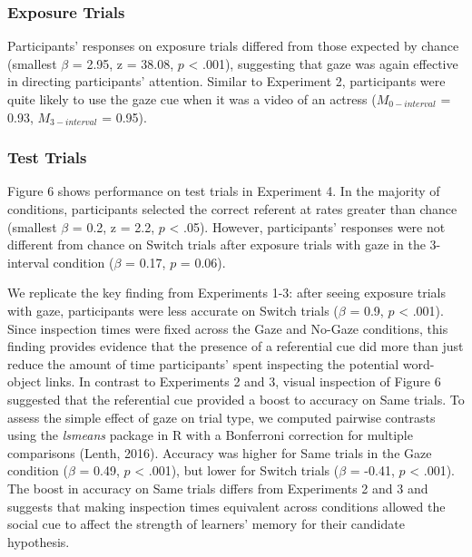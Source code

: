 \documentclass[oneside]{report}
\begin{document}
\hypertarget{exposure-trials-3}{%
\subsubsection{Exposure Trials}\label{exposure-trials-3}}

Participants' responses on exposure trials differed from those expected
by chance (smallest \(\beta\) = 2.95, z = 38.08, \(p\) \textless{}
.001), suggesting that gaze was again effective in directing
participants' attention. Similar to Experiment 2, participants were
quite likely to use the gaze cue when it was a video of an actress
(\(M_{0-interval}\) = 0.93, \(M_{3-interval}\) = 0.95).

\hypertarget{test-trials-3}{%
\subsubsection{Test Trials}\label{test-trials-3}}

Figure 6 shows performance on test trials in Experiment 4. In the
majority of conditions, participants selected the correct referent at
rates greater than chance (smallest \(\beta\) = 0.2, z = 2.2, \(p\)
\textless{} .05). However, participants' responses were not different
from chance on Switch trials after exposure trials with gaze in the
3-interval condition (\(\beta\) = 0.17, \(p\) = 0.06).

We replicate the key finding from Experiments 1-3: after seeing exposure
trials with gaze, participants were less accurate on Switch trials
(\(\beta\) = 0.9, \(p\) \textless{} .001). Since inspection times were
fixed across the Gaze and No-Gaze conditions, this finding provides
evidence that the presence of a referential cue did more than just
reduce the amount of time participants' spent inspecting the potential
word-object links. In contrast to Experiments 2 and 3, visual inspection
of Figure 6 suggested that the referential cue provided a boost to
accuracy on Same trials. To assess the simple effect of gaze on trial
type, we computed pairwise contrasts using the \emph{lsmeans} package in
R with a Bonferroni correction for multiple comparisons (Lenth, 2016).
Accuracy was higher for Same trials in the Gaze condition (\(\beta\) =
0.49, \(p\) \textless{} .001), but lower for Switch trials (\(\beta\) =
-0.41, \(p\) \textless{} .001). The boost in accuracy on Same trials
differs from Experiments 2 and 3 and suggests that making inspection
times equivalent across conditions allowed the social cue to affect the
strength of learners' memory for their candidate hypothesis.
\end{document}
